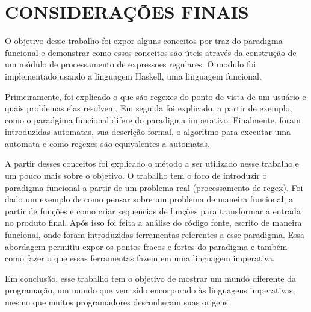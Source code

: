 \section{CONSIDERAÇÕES FINAIS}

O objetivo desse trabalho foi expor alguns conceitos por traz do paradigma funcional e demonstrar como esses conceitos são úteis através da construção de um módulo de processamento de expressoes regulares.
O modulo foi implementado usando a linguagem Haskell, uma linguagem funcional.

Primeiramente, foi explicado o que são regexes do ponto de vista de um usuário e quais problemas elas resolvem.
Em seguida foi explicado, a partir de exemplo, como o paradgima funcional difere do paradigma imperativo.
Finalmente, foram introduzidas automatas, sua descrição formal, o algoritmo para executar uma automata e como regexes são equivalentes a automatas.

A partir desses conceitos foi explicado o método a ser utilizado nesse trabalho e um pouco mais sobre o objetivo.
O trabalho tem o foco de introduzir o paradigma funcional a partir de um problema real (processamento de regex).
Foi dado um exemplo de como pensar sobre um problema de maneira funcional, a partir de funções e como criar sequencias de funções para transformar a entrada no produto final.
Após isso foi feita a análise do código fonte, escrito de maneira funcional, onde foram introduzidas ferramentas referentes a esse paradigma.
Essa abordagem permitiu expor os pontos fracos e fortes do paradigma e também como fazer o que essas ferramentas fazem em uma linguagem imperativa.

Em conclusão, esse trabalho tem o objetivo de mostrar um mundo diferente da programação, um mundo que vem sido encorporado às linguagens imperativas, mesmo que muitos programadores desconhecam suas origens.


